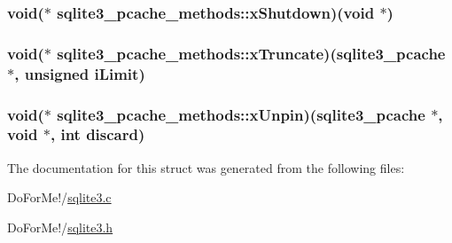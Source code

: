 \hypertarget{structsqlite3__pcache__methods_aa88bb238d288631e7e06f4da232c3dbb}{
\subsubsection[{x\-Shutdown}]{\setlength{\rightskip}{0pt plus 5cm}void($\ast$ sqlite3\-\_\-pcache\-\_\-methods\-::x\-Shutdown)(void $\ast$)}}\label{structsqlite3__pcache__methods_aa88bb238d288631e7e06f4da232c3dbb}
\hypertarget{structsqlite3__pcache__methods_aad73f9335999770bcd2dc6a2d914b4f0}{
\subsubsection[{x\-Truncate}]{\setlength{\rightskip}{0pt plus 5cm}void($\ast$ sqlite3\-\_\-pcache\-\_\-methods\-::x\-Truncate)({\bf sqlite3\-\_\-pcache} $\ast$, unsigned i\-Limit)}}\label{structsqlite3__pcache__methods_aad73f9335999770bcd2dc6a2d914b4f0}
\hypertarget{structsqlite3__pcache__methods_ade2ab50cc6896be03ee86541877fa85e}{
\subsubsection[{x\-Unpin}]{\setlength{\rightskip}{0pt plus 5cm}void($\ast$ sqlite3\-\_\-pcache\-\_\-methods\-::x\-Unpin)({\bf sqlite3\-\_\-pcache} $\ast$, void $\ast$, int discard)}}\label{structsqlite3__pcache__methods_ade2ab50cc6896be03ee86541877fa85e}


The documentation for this struct was generated from the following files\-:\begin{DoxyCompactItemize}
\item 
Do\-For\-Me!/\hyperlink{sqlite3_8c}{sqlite3.\-c}\item 
Do\-For\-Me!/\hyperlink{sqlite3_8h}{sqlite3.\-h}\end{DoxyCompactItemize}
